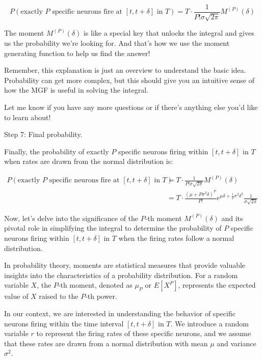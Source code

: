 \begin{equation}
P(\text{exactly } P \text{ specific neurons fire at } [t, t + \delta] \text{ in } T) = T \cdot \frac{1}{P! \sigma \sqrt{2\pi}} M^{(P)}(\delta)
\end{equation}

The moment \(M^{(P)}(\delta)\) is like a special key that unlocks the integral and gives us the probability we're looking for. And that's how we use the moment generating function to help us find the answer!

Remember, this explanation is just an overview to understand the basic idea. Probability can get more complex, but this should give you an intuitive sense of how the MGF is useful in solving the integral.

Let me know if you have any more questions or if there's anything else you'd like to learn about!



Step 7: Final probability.

Finally, the probability of exactly \( P \) specific neurons firing within \([t, t + \delta]\) in \( T \) when rates are drawn from the normal distribution is:

\begin{equation}
\begin{aligned}
P(\text{exactly } P \text{ specific neurons fire at } [t, t + \delta] \text{ in } T) &= T \cdot \frac{1}{P! \sigma \sqrt{2\pi}} M^{(P)}(\delta) \\
&= T \cdot \frac{(\mu + P\sigma^2\delta)^P}{P!} e^{\mu\delta + \frac{1}{2}\sigma^2 \delta^2} \frac{1}{\sigma \sqrt{2\pi}}
\end{aligned}
\end{equation}



Now, let's delve into the significance of the \(P\)-th moment \(M^{(P)}(\delta)\) and its pivotal role in simplifying the integral to determine the probability of \(P\) specific neurons firing within \([t, t + \delta]\) in \(T\) when the firing rates follow a normal distribution.

In probability theory, moments are statistical measures that provide valuable insights into the characteristics of a probability distribution. For a random variable \(X\), the \(P\)-th moment, denoted as \(\mu_P\) or \(E[X^P]\), represents the expected value of \(X\) raised to the \(P\)-th power.

In our context, we are interested in understanding the behavior of specific neurons firing within the time interval \([t, t + \delta]\) in \(T\). We introduce a random variable \(r\) to represent the firing rates of these specific neurons, and we assume that these rates are drawn from a normal distribution with mean \(\mu\) and variance \(\sigma^2\).

